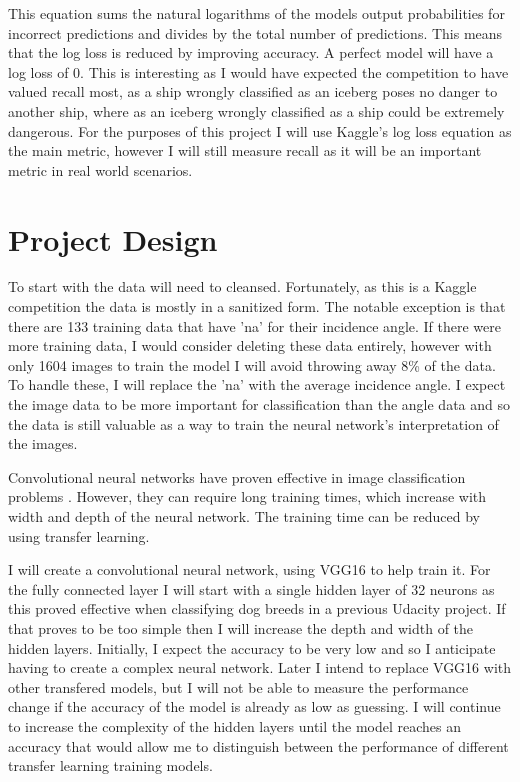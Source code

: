 \documentclass{article}
\begin{document}
This equation sums the natural logarithms of the models output probabilities for incorrect predictions and divides by the total number of predictions. This means that the log loss is reduced by improving accuracy. A perfect model will have a log loss of 0. This is interesting as I would have expected the competition to have valued recall most, as a ship wrongly classified as an iceberg poses no danger to another ship, where as an iceberg wrongly classified as a ship could be extremely dangerous. For the purposes of this project I will use Kaggle's log loss equation as the main metric, however I will still measure recall as it will be an important metric in real world scenarios. 

\section{Project Design}

To start with the data will need to cleansed. Fortunately, as this is a Kaggle competition the data is mostly in a sanitized form. The notable exception is that there are 133 training data that have 'na' for their incidence angle. If there were more training data, I would consider deleting these data entirely, however with only 1604 images to train the model I will avoid throwing away 8\% of the data. To handle these, I will replace the 'na' with the average incidence angle. I expect the image data to be more important for classification than the angle data and so the data is still valuable as a way to train the neural network's interpretation of the images.

Convolutional neural networks have proven effective in image classification problems \cite{deepcnn}. However, they can require long training times, which increase with width and depth of the neural network. The training time can be reduced by using transfer learning. 

I will create a convolutional neural network, using VGG16 to help train it. For the fully connected layer I will start with a single hidden layer of 32 neurons as this proved effective when classifying dog breeds in a previous Udacity project. If that proves to be too simple then I will increase the depth and width of the hidden layers. Initially, I expect the accuracy to be very low and so I anticipate having to create a complex neural network. Later I intend to replace VGG16 with other transfered models, but I will not be able to measure the performance change if the accuracy of the model is already as low as guessing.  I will continue to increase the complexity of the hidden layers until the model reaches an accuracy that would allow me to distinguish between the performance of different transfer learning training models.
\end{document}
